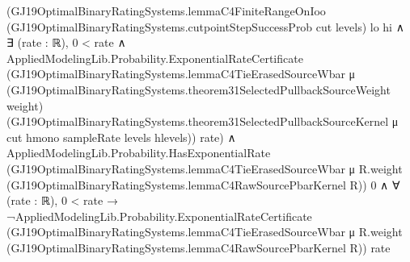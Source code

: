 \documentclass[10pt]{article}
\begin{document}
\begin{ReviewVerbatim}
                            (GJ19OptimalBinaryRatingSystems.lemmaC4FiniteRangeOnIoo
                                  (GJ19OptimalBinaryRatingSystems.cutpointStepSuccessProb cut levels) lo hi ∧
                                ∃ (rate : ℝ),
                                  0 < rate ∧
                                    AppliedModelingLib.Probability.ExponentialRateCertificate
                                      (GJ19OptimalBinaryRatingSystems.lemmaC4TieErasedSourceWbar μ
                                        (GJ19OptimalBinaryRatingSystems.theorem31SelectedPullbackSourceWeight weight)
                                        (GJ19OptimalBinaryRatingSystems.theorem31SelectedPullbackSourceKernel μ cut
                                          hmono sampleRate levels hlevels))
                                      rate) ∧
                              AppliedModelingLib.Probability.HasExponentialRate
                                  (GJ19OptimalBinaryRatingSystems.lemmaC4TieErasedSourceWbar μ R.weight
                                    (GJ19OptimalBinaryRatingSystems.lemmaC4RawSourcePbarKernel R))
                                  0 ∧
                                ∀ (rate : ℝ),
                                  0 < rate →
                                    ¬AppliedModelingLib.Probability.ExponentialRateCertificate
                                        (GJ19OptimalBinaryRatingSystems.lemmaC4TieErasedSourceWbar μ R.weight
                                          (GJ19OptimalBinaryRatingSystems.lemmaC4RawSourcePbarKernel R))
                                        rate
\end{ReviewVerbatim}
\end{document}

